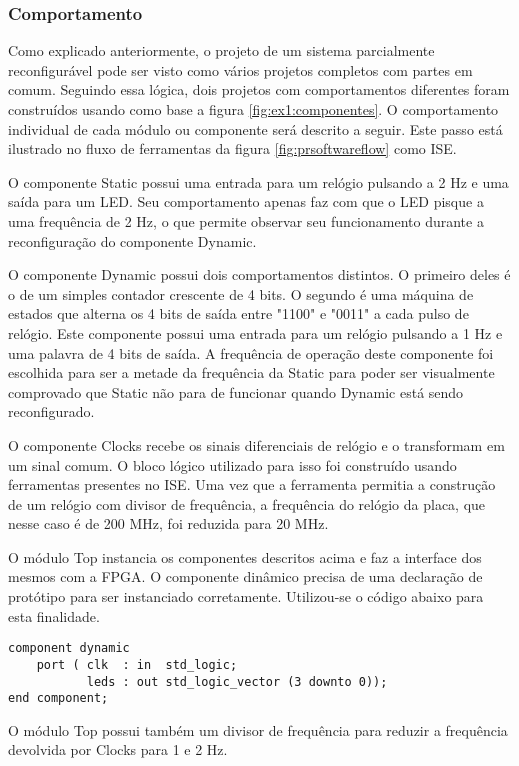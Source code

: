 \documentclass[11pt,a4paper,oneside]{book}
\begin{document}
\subsubsection{Comportamento}
Como explicado anteriormente, o projeto de um sistema parcialmente reconfigurável pode ser visto como vários projetos completos com partes em comum.
Seguindo essa lógica, dois projetos com comportamentos diferentes foram construídos usando como base a figura \ref{fig:ex1:componentes}.
O comportamento individual de cada módulo ou componente será descrito a seguir.
Este passo está ilustrado no fluxo de ferramentas da figura \ref{fig:prsoftwareflow} como ISE.

O componente \dlq{}Static\drq{} possui uma entrada para um relógio pulsando a 2 Hz e uma saída para um LED.
Seu comportamento apenas faz com que o LED pisque a uma frequência de 2 Hz, o que permite observar seu funcionamento durante a reconfiguração do componente \dlq{}Dynamic\drq{}.

O componente \dlq{}Dynamic\drq{} possui dois comportamentos distintos.
O primeiro deles é o de um simples contador crescente de 4 bits.
O segundo é uma máquina de estados que alterna os 4 bits de saída entre "1100" e "0011" a cada pulso de relógio.
Este componente possui uma entrada para um relógio pulsando a 1 Hz e uma palavra de 4 bits de saída.
A frequência de operação deste componente foi escolhida para ser a metade da frequência da \dlq{}Static\drq{} para poder ser visualmente comprovado que \dlq{}Static\drq{} não para de funcionar quando \dlq{}Dynamic\drq{} está sendo reconfigurado.

O componente \dlq{}Clocks\drq{} recebe os sinais diferenciais de relógio e o transformam em um sinal comum.
O bloco lógico utilizado para isso foi construído usando ferramentas presentes no ISE.
Uma vez que a ferramenta permitia a construção de um relógio com divisor de frequência, a frequência do relógio da placa, que nesse caso é de 200 MHz, foi reduzida para 20 MHz.

O módulo \dlq{}Top\drq{} instancia os componentes descritos acima e faz a interface dos mesmos com a FPGA.
O componente dinâmico precisa de uma declaração de protótipo para ser instanciado corretamente.
Utilizou-se o código abaixo para esta finalidade.
\begin{lstlisting}[style=customVHDL]
component dynamic
    port ( clk  : in  std_logic;
           leds : out std_logic_vector (3 downto 0));
end component;
\end{lstlisting}
O módulo \dlq{}Top\drq{} possui também um divisor de frequência para reduzir a frequência devolvida por \dlq{}Clocks\drq{} para 1 e 2 Hz.
\end{document}
